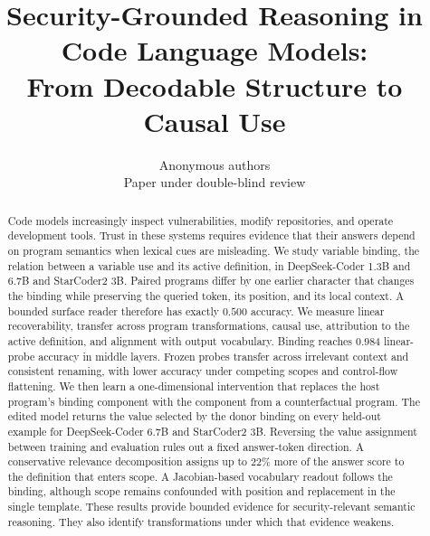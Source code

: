 \documentclass[10pt]{article}
\title{\vspace{-3.5em}\bfseries Security-Grounded Reasoning in Code Language Models:\\[0.15em]
From Decodable Structure to Causal Use}
\author{Anonymous authors\\\small Paper under double-blind review}
\date{}
\begin{document}
\maketitle
\vspace{-2.2em}

\begin{center}
\end{center}

\begin{abstract}
\noindent
Code models increasingly inspect vulnerabilities, modify repositories, and
operate development tools. Trust in these systems requires evidence that their
answers depend on program semantics when lexical cues are misleading. We study
variable binding, the relation between a variable use and its active definition,
in DeepSeek-Coder 1.3B and 6.7B and StarCoder2 3B. Paired programs differ by one
earlier character that changes the binding while preserving the queried token,
its position, and its local context. A bounded surface reader therefore has
exactly $0.500$ accuracy. We measure linear recoverability, transfer across
program transformations, causal use, attribution to the active definition, and
alignment with output vocabulary. Binding reaches $0.984$ linear-probe accuracy
in middle layers. Frozen probes transfer across irrelevant context and consistent
renaming, with lower accuracy under competing scopes and control-flow flattening.
We then learn a one-dimensional intervention that replaces the host program's
binding component with the component from a counterfactual program. The edited
model returns the value selected by the donor binding on every held-out example
for DeepSeek-Coder 6.7B and StarCoder2 3B. Reversing the value assignment between
training and evaluation rules out a fixed answer-token direction. A conservative
relevance decomposition assigns up to $22\%$ more of the answer score to the
definition that enters scope. A Jacobian-based vocabulary readout follows the
binding, although scope remains confounded with position and replacement in the
single template. These results provide bounded evidence for security-relevant
semantic reasoning. They also identify transformations under which that evidence
weakens.
\end{abstract}
\end{document}
